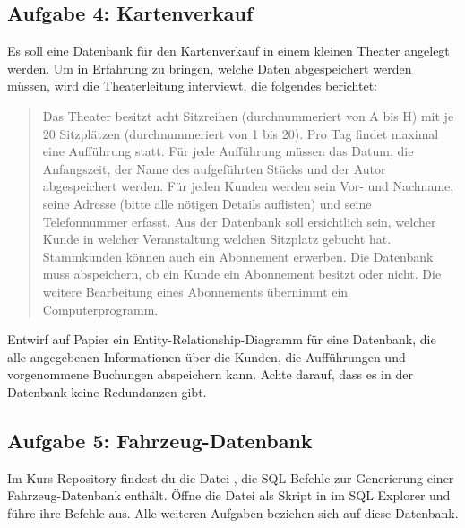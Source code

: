 \subsection{Aufgabe 4: Kartenverkauf}

Es soll eine Datenbank für den Kartenverkauf in einem kleinen Theater angelegt
werden. Um in Erfahrung zu bringen, welche Daten abgespeichert werden müssen,
wird die Theaterleitung interviewt, die folgendes berichtet:

\begin{quotation}
\noindent
Das Theater besitzt acht Sitzreihen (durchnummeriert von A bis H) mit je 20
Sitzplätzen (durchnummeriert von 1 bis 20). Pro Tag findet maximal eine
Aufführung statt. Für jede Aufführung müssen das Datum, die Anfangszeit, der
Name des aufgeführten Stücks und der Autor abgespeichert werden. Für jeden
Kunden werden sein Vor- und Nachname, seine Adresse (bitte alle nötigen Details
auflisten) und seine Telefonnummer erfasst. Aus der Datenbank soll ersichtlich
sein, welcher Kunde in welcher Veranstaltung welchen Sitzplatz gebucht hat.
Stammkunden können auch ein Abonnement erwerben. Die Datenbank muss
abspeichern, ob ein Kunde ein Abonnement besitzt oder nicht. Die weitere
Bearbeitung eines Abonnements übernimmt ein Computerprogramm.
\end{quotation}

Entwirf auf Papier ein Entity-Relationship-Diagramm für eine Datenbank, die
alle angegebenen Informationen über die Kunden, die Aufführungen und
vorgenommene Buchungen abspeichern kann. Achte darauf, dass es in der Datenbank
keine Redundanzen gibt.


\subsection{Aufgabe 5: Fahrzeug-Datenbank}

Im Kurs-Repository findest du die Datei , die SQL-Befehle
zur Generierung einer Fahrzeug-Datenbank enthält. Öffne die Datei als Skript in
im SQL Explorer und führe ihre Befehle aus. Alle weiteren Aufgaben beziehen
sich auf diese Datenbank.

